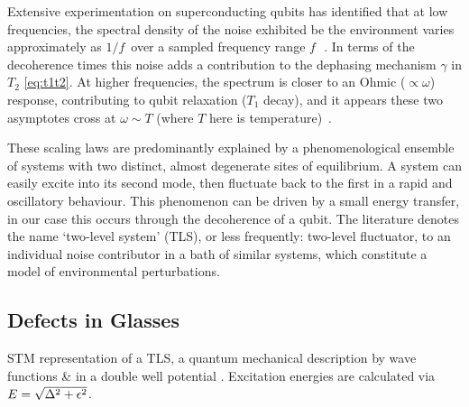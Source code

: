 Extensive experimentation on superconducting qubits has identified that at low frequencies, the spectral density of the noise exhibited be the environment varies approximately as $1/f\,$ over a sampled frequency range $f\,$~\cite{Dutta1981}.
In terms of the decoherence times this noise adds a contribution to the dephasing mechanism $\gamma$ in $T_2$ \cref{eq:t1t2}.
At higher frequencies, the spectrum is closer to an Ohmic ($\propto \omega$) response, contributing to qubit relaxation ($T_1$ decay), and it appears these two asymptotes cross at $\omega \sim T$ (where $T$ here is temperature)~\cite{Astafiev2004}.

These scaling laws are predominantly explained by a phenomenological ensemble of systems with two distinct, almost degenerate sites of equilibrium.
A system can easily excite into its second mode, then fluctuate back to the first in a rapid and oscillatory behaviour.
This phenomenon can be driven by a small energy transfer, in our case this occurs through the decoherence of a qubit.
The literature denotes the name `two-level system' (TLS), or less frequently: two-level fluctuator, to an individual noise contributor in a bath of similar systems, which constitute a model of environmental perturbations.

\subsection{Defects in Glasses}\label{sec:glass}

\begin{marginfigure}
\resizebox{\marginparwidth}{!}{}
\caption[STM Picture of a TLS]{\label{fig:stmtls}STM representation of a TLS, a quantum mechanical description by wave functions  \&  in a double well potential . Excitation energies are calculated via $\cramped{E = \sqrt{\Delta^2+\epsilon^2}}$.}
\end{marginfigure}

